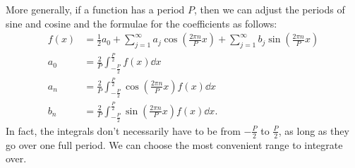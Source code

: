 \documentclass[../classical_mechanics.tex]{subfiles}
\begin{document}
            More generally, if a function has a period $P$, then we can adjust the periods of sine and cosine and the formulae for the coefficients as follows:
            \begin{align}
                f(x)&=\frac{1}{2}a_0+\sum_{j=1}^\infty a_j\cos\left(\frac{2\pi n}{P}x\right)+\sum_{j=1}^\infty b_j\sin\left(\frac{2\pi n}{P}x\right)\\
                a_0&=\frac{2}{P}\int_{-\frac{P}{2}}^{\frac{P}{2}}f(x)\dd{x}\\
                a_n&=\frac{2}{P}\int_{-\frac{P}{2}}^{\frac{P}{2}}\cos\left(\frac{2\pi n}{P}x\right)f(x)\dd{x}\\
                b_n&=\frac{2}{P}\int_{-\frac{P}{2}}^{\frac{P}{2}}\sin\left(\frac{2\pi n}{P}x\right)f(x)\dd{x}.
            \end{align}
            In fact, the integrals don't necessarily have to be from $-\frac{P}{2}$ to $\frac{P}{2}$, as long as they go over one full period.
            We can choose the most convenient range to integrate over.
\end{document}
